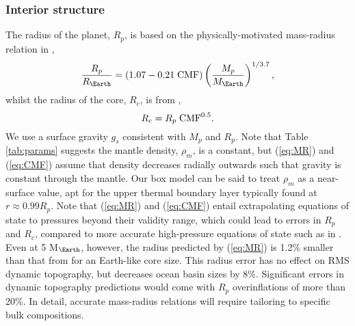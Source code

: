 \documentclass[trackchanges]{aastex63}
\newcommand{\todo}[1]{\textit{\textcolor{violet}{{#1}}}}
\newcommand{\jr}[1]{\textit{\textcolor{blue}{{#1}}}}
\begin{document}

\subsubsection{Interior structure}

The radius of the planet, $R_p$, is based on the physically-motivated mass-radius relation in \citet{zeng_mass-radius_2016},
\begin{equation}\label{eq:MR}
\frac{R_p}{R_\Earth} = (1.07 - 0.21\; {\rm CMF})\left(\frac{M_p}{M_\Earth}\right)^{1/3.7},
\end{equation}
whilst the radius of the core, $R_c$, is from \citet{zeng_simple_2017},
\begin{equation}\label{eq:CMF}
R_c = R_p \; {\rm CMF}^{0.5}.
\end{equation}
We use a surface gravity $g_s$ consistent with $M_p$ and $R_p$. Note that Table \ref{tab:params} suggests the mantle density, $\rho_m$, is a constant, but (\ref{eq:MR}) and (\ref{eq:CMF}) assume that density decreases radially outwards such that gravity is constant through the mantle. Our box model can be said to treat $\rho_m$ as a near-surface value, apt for the upper thermal boundary layer typically found at $r \approx 0.99R_p$. Note that (\ref{eq:MR}) and (\ref{eq:CMF}) entail extrapolating equations of state to pressures beyond their validity range, which could lead to errors in $R_p$ and $R_c$, compared to more accurate high-pressure equations of state such as in \citet{hakim_new_2018}. Even at 5 M$_\Earth$, however, the radius predicted by (\ref{eq:MR}) is 1.2\% smaller than that from \citet{hakim_new_2018} for an Earth-like core size. This radius error has no effect on RMS dynamic topography, but decreases ocean basin sizes by 8\%. Significant errors in dynamic topography predictions would come with $R_p$ overinflations of more than 20\%. In detail, accurate mass-radius relations will require tailoring to specific bulk compositions.
\end{document}
